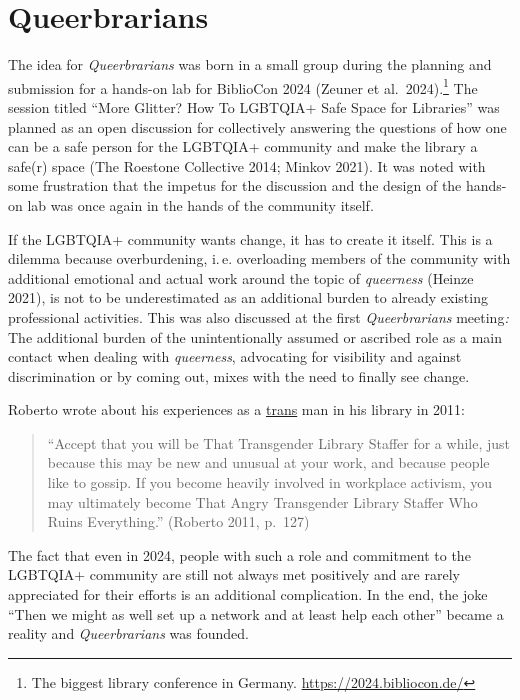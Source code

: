\documentclass[a4paper,
fontsize=11pt,
oneside,
numbers=noperiodatend,
parskip=half-,
bibliography=totoc,
final
]{scrartcl}
\begin{document}
\hypertarget{queerbrarians}{%
\section{Queerbrarians}\label{queerbrarians}}

The idea for \emph{Queerbrarians} was born in a small group during the
planning and submission for a hands-on lab for BiblioCon 2024 (Zeuner
et al.~2024).\footnote{The biggest library conference in Germany.
  \url{https://2024.bibliocon.de/}} The session titled \enquote{More Glitter?
How To LGBTQIA+ Safe Space for Libraries} was planned as an open
discussion for collectively answering the questions of how one can be a
safe person for the LGBTQIA+ community and make the library a safe(r)
space (The Roestone Collective 2014; Minkov 2021). It was noted with
some frustration that the impetus for the discussion and the design of
the hands-on lab was once again in the hands of the community itself.

If the LGBTQIA+ community wants change, it has to create it itself. This
is a dilemma because overburdening, i.\,e. overloading members of the
community with additional emotional and actual work around the topic of
\emph{queerness} (Heinze 2021), is not to be underestimated as an
additional burden to already existing professional activities. This was
also discussed at the first \emph{Queerbrarians} meeting\emph{:} The
additional burden of the unintentionally assumed or ascribed role as a
main contact when dealing with \emph{queerness}, advocating for
visibility and against discrimination or by coming out, mixes with the
need to finally see change.

Roberto wrote about his experiences as a
\href{https://lgbtqia.fandom.com/wiki/Transgender}{trans} man in his
library in 2011:

\begin{quote}
\enquote{Accept that you will be That Transgender Library Staffer for a while,
just because this may be new and unusual at your work, and because
people like to gossip. If you become heavily involved in workplace
activism, you may ultimately become That Angry Transgender Library
Staffer Who Ruins Everything.} (Roberto 2011, p.~127)
\end{quote}

The fact that even in 2024, people with such a role and commitment to
the LGBTQIA+ community are still not always met positively and are
rarely appreciated for their efforts is an additional complication. In
the end, the joke \enquote{Then we might as well set up a network and at least
help each other} became a reality and \emph{Queerbrarians} was founded.
\end{document}
